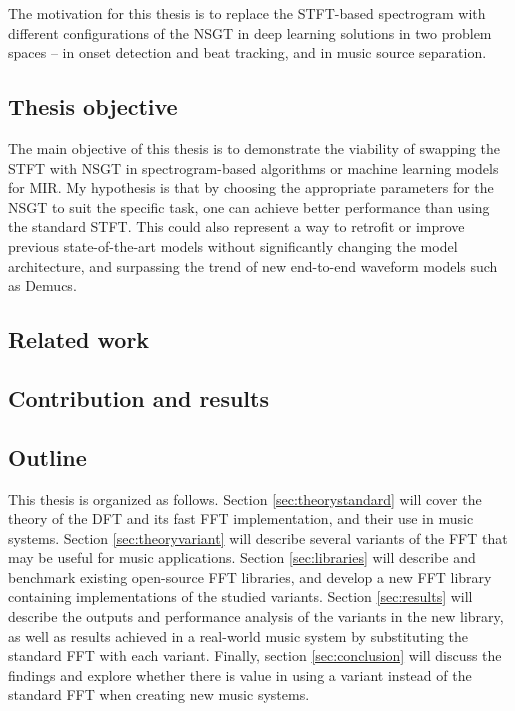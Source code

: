 \documentclass[letter,12pt,notitlepage]{article}
\begin{document}
The motivation for this thesis is to replace the STFT-based spectrogram with different configurations of the NSGT in deep learning solutions in two problem spaces -- in onset detection and beat tracking, and in music source separation.

\subsection{Thesis objective}

The main objective of this thesis is to demonstrate the viability of swapping the STFT with NSGT in spectrogram-based algorithms or machine learning models for MIR. My hypothesis is that by choosing the appropriate parameters for the NSGT to suit the specific task, one can achieve better performance than using the standard STFT. This could also represent a way to retrofit or improve previous state-of-the-art models without significantly changing the model architecture, and surpassing the trend of new end-to-end waveform models such as Demucs.

\subsection{Related work}

\subsection{Contribution and results}

\subsection{Outline}

This thesis is organized as follows. Section \ref{sec:theorystandard} will cover the theory of the DFT and its fast FFT implementation, and their use in music systems. Section \ref{sec:theoryvariant} will describe several variants of the FFT that may be useful for music applications. Section \ref{sec:libraries} will describe and benchmark existing open-source FFT libraries, and develop a new FFT library containing implementations of the studied variants. Section \ref{sec:results} will describe the outputs and performance analysis of the variants in the new library, as well as results achieved in a real-world music system by substituting the standard FFT with each variant. Finally, section \ref{sec:conclusion} will discuss the findings and explore whether there is value in using a variant instead of the standard FFT when creating new music systems.
\end{document}
